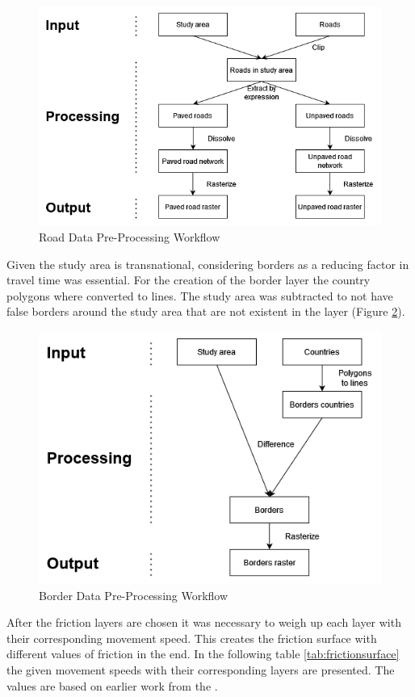 \documentclass[11pt, a4paper]{report}
\begin{document}
\begin{figure}[H]
  \centering
  \includegraphics[width=0.9\linewidth]{figures/roadsworkflow.png}
  \caption{Road Data Pre-Processing Workflow}
  \label{fig:roadsworkflow}
\end{figure}

Given the study area is transnational, considering borders as a reducing factor in travel time was essential. For the creation of the border layer the country polygons where converted to lines. The study area was subtracted to not have false borders around the study area that are not existent in the layer (Figure \ref{fig:bordersworkflow}). 

\begin{figure}[H]
  \centering
  \includegraphics[width=0.9\linewidth]{figures/bordersworkflow.png}
  \caption{Border Data Pre-Processing Workflow}
  \label{fig:bordersworkflow}
\end{figure}

After the friction layers are chosen it was necessary to weigh up each layer with their corresponding movement speed. This creates the friction surface with different values of friction in the end. In the following table \ref{tab:frictionsurface} the given movement speeds with their corresponding layers are presented. The values are based on earlier work from the \citet{european_commission_joint_research_centre_global_2021}.
\end{document}
